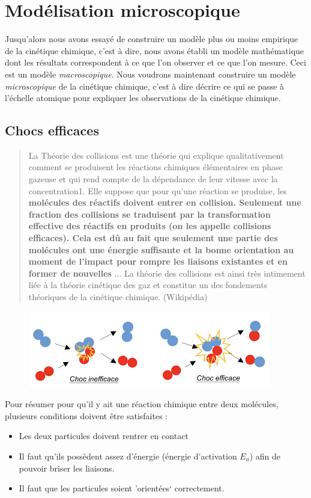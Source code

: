 \documentclass[11pt,a4paper]{article}
\begin{document}

\section{Modélisation microscopique}
Jusqu'alors nous avons essayé de construire un modèle plus ou moins empirique de la cinétique chimique, c'est à dire, nous avons établi un modèle mathématique dont les résultats correspondent à ce que l'on observer et ce que l'on mesure. Ceci est un modèle \emph{macroscopique}. Nous voudrons maintenant construire un modèle \emph{microscopique} de la cinétique chimique, c'est à dire décrire ce qui se passe à l'échelle atomique pour expliquer les observations de la cinétique chimique. 

\subsection{Chocs efficaces}

\begin{quote}
La Théorie des collisions est une théorie qui explique qualitativement comment se produisent les réactions chimiques élémentaires en phase gazeuse et qui rend compte de la dépendance de leur vitesse avec la concentration1. Elle suppose que pour qu'une réaction se produise, les \textbf{molécules des réactifs doivent entrer en collision. Seulement une fraction des collisions se traduisent par la transformation effective des réactifs en produits (on les appelle collisions efficaces). Cela est dû au fait que seulement une partie des molécules ont une énergie suffisante et la bonne orientation au moment de l'impact pour rompre les liaisons existantes et en former de nouvelles} ... La théorie des collisions est ainsi très intimement liée à la théorie cinétique des gaz et constitue un des fondements théoriques de la cinétique chimique.    (Wikipédia)
\end{quote}

\begin{figure}[h]
    \centering
    \includegraphics{imgs/c4/chocs.png}
\end{figure}
Pour résumer pour qu'il y ait une réaction chimique entre deux molécules, plusieurs conditions doivent être satisfaites : 
\begin{itemize}
    \item Les deux particules doivent rentrer en contact
    \item Il faut qu'ils possèdent assez d'énergie (énergie d'activation $E_a$) afin de pouvoir briser les liaisons. 
    \item Il faut que les particules soient 'orientées` correctement. 
\end{itemize}
\end{document}
